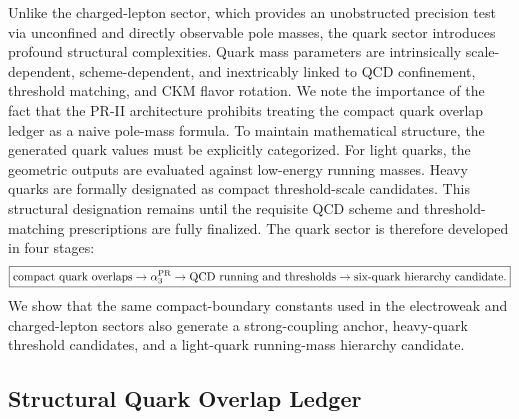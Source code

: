\documentclass[11pt]{article}
\begin{document}
Unlike the charged-lepton sector, which provides an unobstructed precision test via unconfined and directly observable pole masses, the quark sector introduces profound structural complexities. Quark mass parameters are intrinsically scale-dependent, scheme-dependent, and inextricably linked to QCD confinement, threshold matching, and CKM flavor rotation. We note the importance of the fact that the PR-II architecture prohibits treating the compact quark overlap ledger as a naive pole-mass formula. To maintain mathematical structure, the generated quark values must be explicitly categorized. For light quarks, the geometric outputs are evaluated against low-energy running masses. Heavy quarks are formally designated as compact threshold-scale candidates. This structural designation remains until the requisite QCD scheme and threshold-matching prescriptions are fully finalized. The quark sector is therefore developed in four stages:
\begin{equation}
\boxed{
\text{compact quark overlaps}
\rightarrow
\alpha_3^{\rm PR}
\rightarrow
\text{QCD running and thresholds}
\rightarrow
\text{six-quark hierarchy candidate}.
}
\end{equation}
We show that the same compact-boundary constants used in the electroweak and charged-lepton sectors also generate a strong-coupling anchor, heavy-quark threshold candidates, and a light-quark running-mass hierarchy candidate. 

\subsection{Structural Quark Overlap Ledger}
\label{sec:pr2_structural_quark_overlap_ledger}
\end{document}
